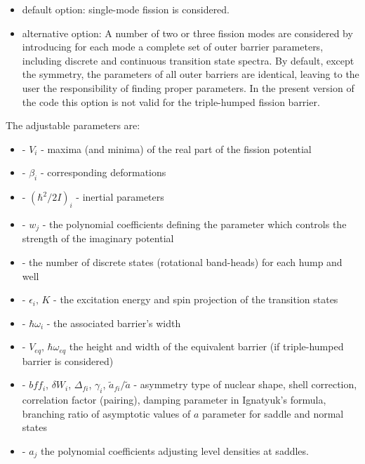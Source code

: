 \begin{itemize}
\item default option: single-mode fission is considered.

\item alternative option: A number of two or three fission modes are
considered by introducing for each mode a complete set of outer barrier
parameters, including discrete and continuous transition state spectra.
By default, except the symmetry, the parameters of all outer barriers are
identical, leaving to the user the responsibility of finding proper
parameters. In the present version of the code this option is not valid for
the triple-humped fission barrier.
\end{itemize}

The adjustable parameters are:

\begin{itemize}
\item - $V_{i}$ - maxima (and minima) of the real part of the fission
potential

\item - $\beta_{i}$ - corresponding deformations

\item - $(\hbar^{2}/2I)_{i}$ - inertial parameters

\item - $w_{j}$ - the polynomial coefficients defining the parameter which
controls the strength of the imaginary potential

\item - the number of discrete states (rotational band-heads) for each hump
and well

\item - $\epsilon_{i},\, K$ - the excitation energy and spin projection of
the transition states

\item - $\hbar\omega_{i}$ - the associated barrier's width

\item - $V_{eq},\,\hbar\omega_{eq}$ the height and width of the equivalent
barrier (if triple-humped barrier is considered)

\item - $bff_{i}$, $\delta W_{i}$, $\Delta_{fi}$, $\gamma_{i}$, $\tilde{a}%
_{fi}/\tilde{a}$ - asymmetry type of nuclear shape, shell correction,
correlation factor (pairing), damping parameter in Ignatyuk's formula,
branching ratio of asymptotic values of $a$ parameter for saddle and normal
states

\item - $a_{j}$ the polynomial coefficients adjusting level densities at
saddles.
\end{itemize}

